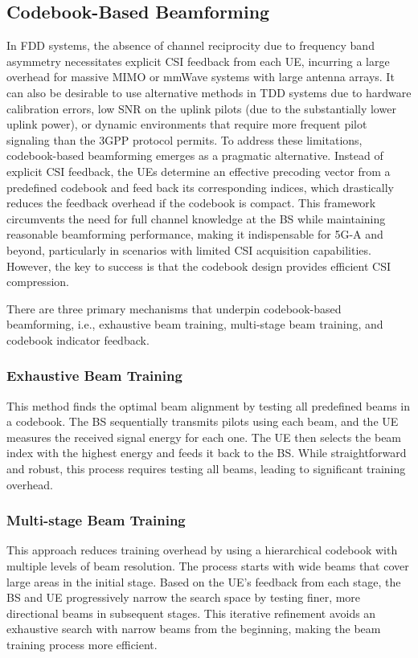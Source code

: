 \documentclass[lettersize,journal]{IEEEtran}
\begin{document}
\subsection{Codebook-Based Beamforming}


In FDD systems, the absence of channel reciprocity due to frequency band asymmetry necessitates explicit CSI feedback from each UE, incurring a large overhead for massive MIMO or mmWave systems with large antenna arrays. It can also be desirable to use alternative methods in TDD systems due to hardware calibration errors, low SNR on the uplink pilots (due to the substantially lower uplink power), or dynamic environments that require more frequent pilot signaling than the 3GPP protocol permits. To address these limitations, codebook-based beamforming emerges as a pragmatic alternative. Instead of explicit CSI feedback, the UEs determine an effective precoding vector from a predefined codebook and feed back its corresponding indices, which drastically reduces the feedback overhead if the codebook is compact. This framework circumvents the need for full channel knowledge at the BS while maintaining reasonable beamforming performance, making it indispensable for 5G-A and beyond, particularly in scenarios with limited CSI acquisition capabilities.
However, the key to success is that the codebook design provides efficient CSI compression.

There are three primary mechanisms that underpin codebook-based beamforming, i.e., exhaustive beam training, multi-stage beam training, and codebook indicator feedback.
\subsubsection{Exhaustive Beam Training}  
This method finds the optimal beam alignment by testing all predefined beams in a codebook. The BS sequentially transmits pilots using each beam, and the UE measures the received signal energy for each one. The UE then selects the beam index with the highest energy and feeds it back to the BS. While straightforward and robust, this process requires testing all beams, leading to significant training overhead.

\subsubsection{Multi-stage Beam Training}  
This approach reduces training overhead by using a hierarchical codebook with multiple levels of beam resolution. The process starts with wide beams that cover large areas in the initial stage. Based on the UE's feedback from each stage, the BS and UE progressively narrow the search space by testing finer, more directional beams in subsequent stages. This iterative refinement avoids an exhaustive search with narrow beams from the beginning, making the beam training process more efficient.
\end{document}
